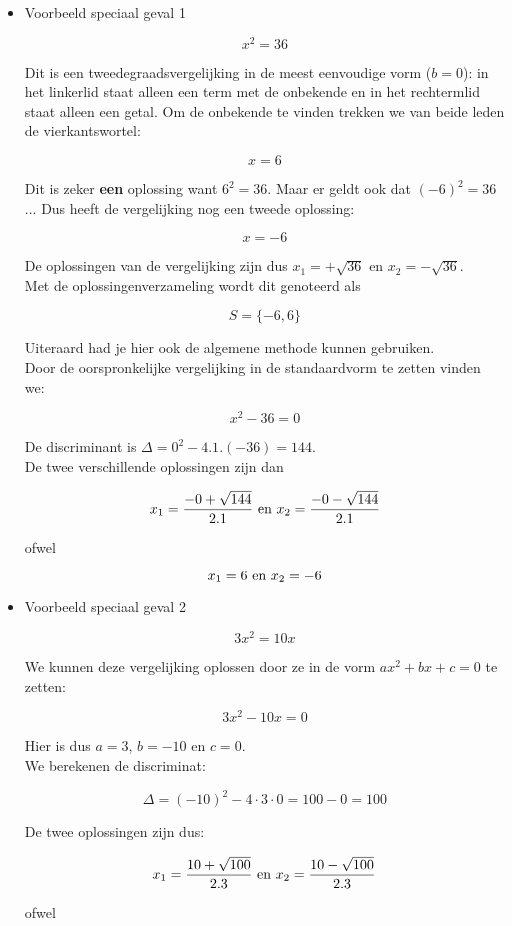 \begin{itemize}
\item{Voorbeeld speciaal geval 1}

\[x^2=36\]

Dit is een tweedegraadsvergelijking in de meest eenvoudige vorm ($b=0$): in het linkerlid staat alleen een term met de onbekende en in het rechtermlid staat alleen een getal. Om de onbekende te vinden trekken we van beide leden de vierkantswortel:

\[ x=6 \]

Dit is zeker {\bf een} oplossing want $6^2 =36$. Maar er geldt ook dat $(-6)^2 =36$... Dus heeft de vergelijking nog een tweede oplossing:

\[ x=-6 \]

De oplossingen van de vergelijking zijn dus $x_{1}=+\sqrt{36}$ en $x_{2}=-\sqrt{36}$.\\
Met de oplossingenverzameling wordt dit genoteerd als

\[ S=\{ -6,6 \} \]

Uiteraard had je hier ook de algemene methode kunnen gebruiken.\\
Door de oorspronkelijke vergelijking in de standaardvorm te zetten vinden we:

\[ x^2 - 36 =0 \]

De discriminant is $\Delta= 0^2 - 4.1.(-36) = 144$.\\
De twee verschillende oplossingen zijn dan

\[ x_{1}=\frac{-0 + \sqrt{144}}{2.1} \textup{  en  } x_{2}=\frac{-0 - \sqrt{144}}{2.1} \]

ofwel

\[ x_{1}=6 \textup{  en  } x_{2}=-6 \]


\item{Voorbeeld speciaal geval 2}

\[3x^2=10x\]

We kunnen deze vergelijking oplossen door ze in de vorm $ax^2+bx+c=0$ te zetten:

\[3x^2-10x=0\]

Hier is dus $a=3$, $b=-10$ en $c=0$.\\
We berekenen de discriminat:

\[\Delta=(-10)^2-4\cdot 3 \cdot 0=100-0=100 \]

De twee oplossingen zijn dus:

\[ x_{1}=\frac{10+\sqrt{100}}{2.3} \textup{  en  } x_{2}=\frac{10-\sqrt{100}}{2.3} \]

ofwel


\end{itemize}
